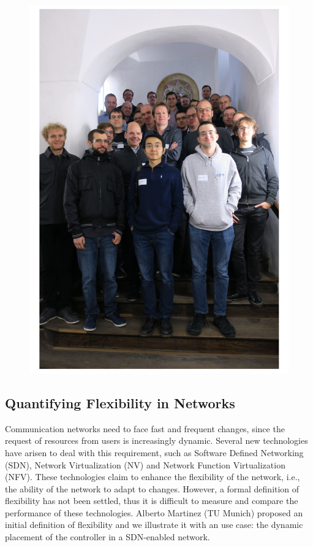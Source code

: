 \begin{figure}[t!]
\includegraphics[width=\linewidth]{figures/group-photo}
\end{figure}

\subsection{Quantifying Flexibility in Networks}

Communication networks need to face fast and frequent changes, since the
request of resources from users is increasingly dynamic. Several new
technologies have arisen to deal with this requirement, such as Software
Defined Networking (SDN), Network Virtualization (NV) and Network Function
Virtualization (NFV). These technologies claim to enhance the flexibility of
the network, i.e., the ability of the network to adapt to changes. However, a
formal definition of flexibility has not been settled, thus it is difficult to
measure and compare the performance of these technologies. Alberto Martinez
(TU Munich) proposed an initial definition of flexibility and we illustrate it
with an use case: the dynamic placement of the controller in a SDN-enabled
network.

